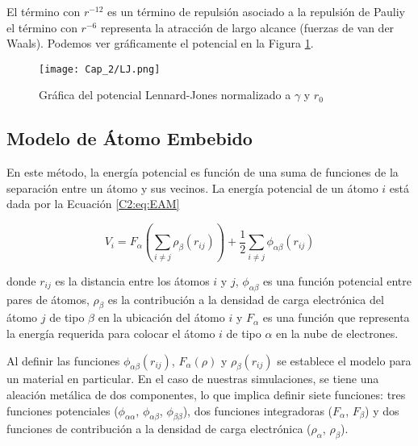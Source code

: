 El término con $r^{-12}$ es un término de repulsión asociado a la repulsión de Pauli\footnotemark[4] y el término con $r^{-6}$ representa la atracción de largo alcance (fuerzas de van der Waals\footnotemark[5]). Podemos ver gráficamente el potencial en la Figura \ref{C2:fg:LJ}.


\begin{figure}[htp]
\centering
\texttt{[image: Cap\_2/LJ.png]}
\caption[Potencial de Lennard-Jones]{Gráfica del potencial Lennard-Jones normalizado a $\gamma$ y $r_{0}$}
\label{C2:fg:LJ}
\end{figure}

\subsection{Modelo de Átomo Embebido}
\label{SS2_3_2}

En este método, la energía potencial es función de una suma de funciones de la separación entre un átomo y sus vecinos. La energía potencial de un átomo $i$ está dada por la Ecuación \ref{C2:eq:EAM}

\begin{equation}
V_{i} = F_{\alpha}\left(\sum_{i\neq j} \rho_{\beta} (r_{ij}) \right) + \frac{1}{2} \sum_{i\neq j} \phi_{\alpha\beta}(r_{ij})
\label{C2:eq:EAM}
\end{equation}

donde $r_{ij}$ es la distancia entre los átomos $i$ y $j$, $\phi_{\alpha\beta}$ es una función potencial entre pares de átomos, $\rho_{\beta}$ es la contribución a la densidad de carga electrónica del átomo $j$ de tipo $\beta$ en la ubicación del átomo $i$ y $F_{\alpha}$ es una función que representa la energía requerida para colocar el átomo $i$ de tipo $\alpha$ en la nube de electrones.

Al definir las funciones $\phi_{\alpha\beta}(r_{ij})$, $F_{\alpha}(\rho)$ y $\rho_{\beta} (r_{ij})$ se establece el modelo para un material en particular. En el caso de nuestras simulaciones, se tiene una aleación metálica de dos componentes, lo que implica definir siete funciones: tres funciones potenciales ($\phi_{\alpha\alpha}$, $\phi_{\alpha\beta}$, $\phi_{\beta\beta}$), dos funciones integradoras ($F_{\alpha}$, $F_{\beta}$) y dos funciones de contribución a la densidad de carga electrónica ($\rho_{\alpha}$, $\rho_{\beta}$).

